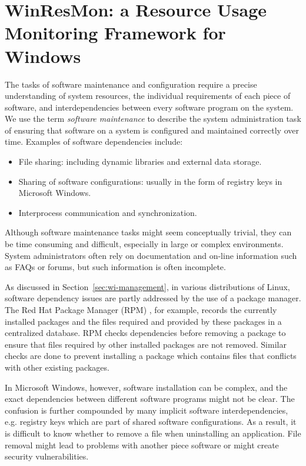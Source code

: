 \clearpage
\section{WinResMon: a Resource Usage Monitoring Framework for Windows}
\label{sec:winresmon}


The tasks of software maintenance and configuration require a precise
understanding of system resources, the individual requirements of each piece
of software, and interdependencies between every software program on the
system.  We use the term {\em software maintenance} to describe the system
administration task of ensuring that software on a system is configured and
maintained correctly over time.  Examples of software dependencies include:

\begin{itemize}
\item File sharing: including dynamic libraries and external data storage.
\item Sharing of software configurations: usually in the form of registry keys
in Microsoft Windows.
\item Interprocess communication and synchronization.
\end{itemize}

Although software maintenance tasks might seem conceptually trivial, they can
be time consuming and difficult, especially in large or complex environments.
System administrators often rely on documentation and on-line information such
as FAQs or forums, but such information is often incomplete.

As discussed in Section~\ref{sec:wi-management},
in various distributions of Linux, software dependency issues are partly
addressed by the use of a package manager.  The Red Hat Package Manager (RPM)
\cite{ewing1996rpm}, for example, records the currently installed packages and the
files required and provided by these packages in a centralized database.  RPM
checks dependencies before removing a package to ensure that files required by
other installed packages are not removed.  Similar checks are done to prevent
installing a package which contains files that conflicts with other existing
packages.

In Microsoft Windows, however, software installation can be complex, and the
exact dependencies between different software programs might not be clear.
The confusion is further compounded by many implicit software
interdependencies, e.g. registry keys which are part of shared software
configurations.  As a result, it is difficult to know whether to remove a file
when uninstalling an application.  File removal might lead to problems with
another piece software or might create security vulnerabilities.  

